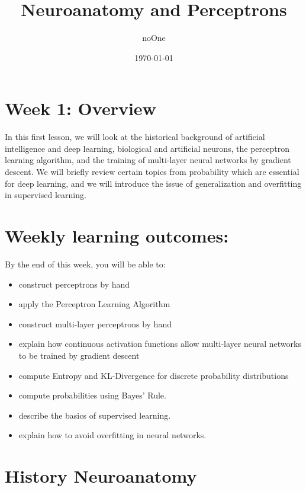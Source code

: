 \documentclass[11pt]{article}
\title{Neuroanatomy and Perceptrons}
\author{noOne}
\date{\today}
\begin{document}
\section{Week 1: Overview}\label{sec:week-1:-overview}
In this first lesson, we will look at the historical background of artificial intelligence and deep learning, biological and artificial neurons, the perceptron learning algorithm, and the training of multi-layer neural networks by gradient descent.
We will briefly review certain topics from probability which are essential for deep learning, and we will introduce the issue of generalization and overfitting in supervised learning.

\section{Weekly learning outcomes:}\label{sec:weekly-learning-outcomes:}
By the end of this week, you will be able to:

\begin{itemize}
    \item construct perceptrons by hand
    \item apply the Perceptron Learning Algorithm
    \item construct multi-layer perceptrons by hand
    \item explain how continuous activation functions allow multi-layer neural networks
to be trained by gradient descent
    \item compute Entropy and KL-Divergence for discrete probability distributions
    \item compute probabilities using Bayes’ Rule.
    \item describe the basics of supervised learning.
    \item explain how to avoid overfitting in neural networks.
\end{itemize}

\pagebreak

\section{History Neuroanatomy}\label{sec:history--neuroanatomy}
\end{document}
